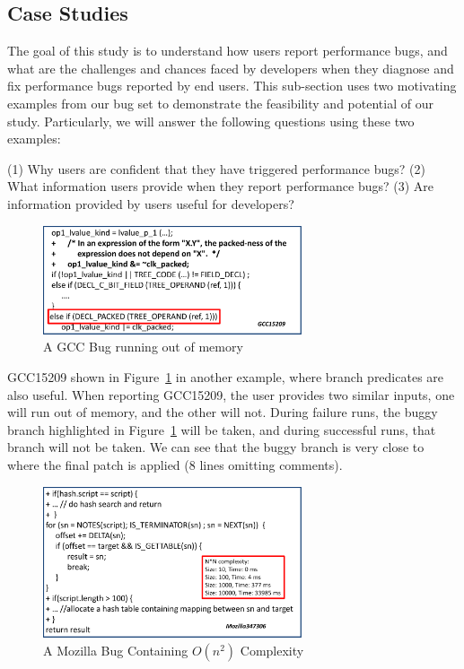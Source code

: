 \subsection{Case Studies}

The goal of this study is to understand how users report performance bugs, 
and what are the challenges and chances faced by developers 
when they diagnose and fix performance bugs reported by end users. 
This sub-section uses two motivating examples from our bug set
to demonstrate the feasibility and potential of our study. 
Particularly, we will answer the following questions using these two examples:

(1) Why users are confident that they have triggered performance bugs?
(2) What information users provide when they report performance bugs?
(3) Are information provided by users useful for developers? 

\begin{figure}[t!]
\begin{center}
\includegraphics[width=3in]{figures/gcc15209}
\caption{A GCC Bug running out of memory}
\label{fig:GCC15209}
\end{center}
\end{figure}

GCC15209 shown in Figure~\ref{fig:GCC15209} in another example, where branch predicates are also useful. 
When reporting GCC15209, the user provides two similar inputs, one will run out of memory, and the other will not. During failure runs, the buggy branch highlighted in Figure~\ref{fig:GCC15209} will be taken, 
and during successful runs, that branch will not be taken. 
We can see that the buggy branch is very close to where the final patch is applied (8 lines omitting comments). 



\begin{figure}[t!]
\begin{center}
\includegraphics[width=3in]{figures/Mozilla347306}
\caption{A Mozilla Bug Containing $O(n^2)$ Complexity}
\label{fig:Mozilla347306}
\end{center}
\end{figure}

